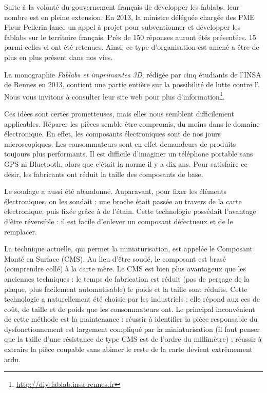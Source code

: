 \medbreak

Suite à la volonté du gouvernement français de développer les fablabs, leur nombre est en pleine extension. En 2013, la ministre déléguée chargée des PME Fleur Pellerin lance un appel à projet pour subventionner et développer les fablabs sur le territoire français. Près de 150 réponses auront étés présentées. 15 parmi celles-ci ont été retenues. Ainsi, ce type d'organisation est amené a être de plus en plus présent dans nos vies. 

La monographie \textit{Fablabs et imprimantes 3D}, rédigée par cinq étudiants de l'INSA de Rennes en 2013, contient une partie entière sur la possibilité de lutte contre l'\op. Nous vous invitons à consulter leur site web pour plus d'information\footnote{\url{http://diy-fablab.insa-rennes.fr}}.


\bigbreak 

Ces idées sont certes prometteuses, mais elles nous semblent difficilement applicables. Réparer les pièces semble  être compromis, du moins dans le domaine électronique. En effet, les composants électroniques sont de nos jours microscopiques. Les consommateurs sont en effet demandeurs de produits toujours plus performants. Il est difficile d'imaginer un téléphone portable sans GPS ni Bluetooth, alors que c'était la norme il y a dix ans. Pour satisfaire ce désir, les fabricants ont réduit la taille des composants de base. 

Le soudage a aussi été abandonné. Auparavant, pour fixer les éléments électroniques, on les soudait : une broche était passée au travers de la carte électronique, puis fixée grâce à de l'étain. Cette technologie possédait l'avantage d'être réversible : il est facile d'enlever un composant défectueux et de le remplacer. 

La technique actuelle, qui permet la miniaturisation, est appelée le Composant Monté en Surface (CMS). Au lieu d'être soudé, le composant est brasé (comprendre collé) à la carte mère. Le CMS est bien plus avantageux que les anciennes techniques : le temps de fabrication est réduit (pas de perçage de la plaque, plus facilement automatisable) le poids et la taille  sont réduits. Cette technologie a naturellement été choisie par les industriels ; elle répond aux 
ces de coût, de taille et de poids que les consommateurs ont. Le principal inconvénient de cette méthode est la maintenance : réussir à identifier la pièce responsable du dysfonctionnement est largement compliqué par la miniaturisation (il faut penser que la taille d'une résistance de type CMS est de  l'ordre du millimètre) ; réussir à extraire la pièce coupable sans abimer le reste de la carte devient extrêmement ardu. 

